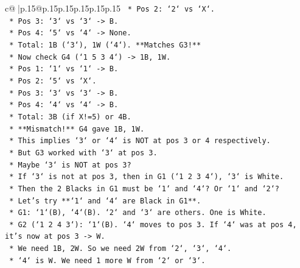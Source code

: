 \documentclass{article}
\begin{document}
{\begin{supertabular}{c@{$\;$}|p{.15\linewidth}@{}p{.15\linewidth}p{.15\linewidth}p{.15\linewidth}p{.15\linewidth}p{.15\linewidth}}
{{{\texttt{                                *   Pos 2: `2` vs `X`.} \\
\texttt{                                *   Pos 3: `3` vs `3` {-}> B.} \\
\texttt{                                *   Pos 4: `5` vs `4` {-}> None.} \\
\texttt{                                *   Total: 1B (`3`), 1W (`4`). **Matches G3!**} \\
\texttt{                            *   Now check G4 (`1 5 3 4`) {-}> 1B, 1W.} \\
\texttt{                                *   Pos 1: `1` vs `1` {-}> B.} \\
\texttt{                                *   Pos 2: `5` vs `X`.} \\
\texttt{                                *   Pos 3: `3` vs `3` {-}> B.} \\
\texttt{                                *   Pos 4: `4` vs `4` {-}> B.} \\
\texttt{                                *   Total: 3B (if X!=5) or 4B.} \\
\texttt{                                *   **Mismatch!** G4 gave 1B, 1W.} \\
\texttt{                                *   This implies `3` or `4` is NOT at pos 3 or 4 respectively.} \\
\texttt{                                *   But G3 worked with `3` at pos 3.} \\
\texttt{                                *   Maybe `3` is NOT at pos 3?} \\
\texttt{                                *   If `3` is not at pos 3, then in G1 (`1 2 3 4`), `3` is White.} \\
\texttt{                                *   Then the 2 Blacks in G1 must be `1` and `4`? Or `1` and `2`?} \\
\texttt{                                *   Let's try **`1` and `4` are Black in G1**.} \\
\texttt{                                    *   G1: `1`(B), `4`(B). `2` and `3` are others. One is White.} \\
\texttt{                                    *   G2 (`1 2 4 3`): `1`(B). `4` moves to pos 3. If `4` was at pos 4, it's now at pos 3 {-}> W.} \\
\texttt{                                    *   We need 1B, 2W. So we need 2W from `2`, `3`, `4`.} \\
\texttt{                                    *   `4` is W. We need 1 more W from `2` or `3`.} \\
}}}
\end{supertabular}}
\end{document}

